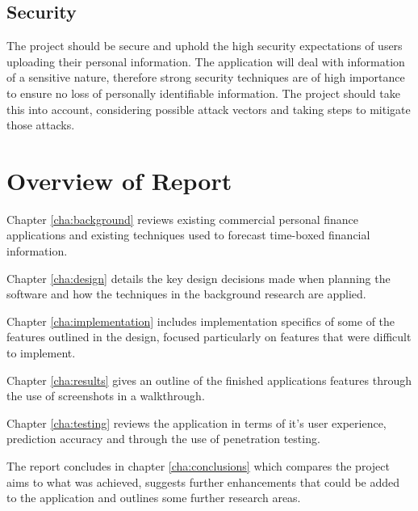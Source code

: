 \subsection{Security}
The project should be secure and uphold the high security expectations of users uploading their personal information.
%
The application will deal with information of a sensitive nature, therefore strong security techniques are of high importance to ensure no loss of personally identifiable information. 
% 
The project should take this into account, considering possible attack vectors and taking steps to mitigate those attacks.

\section{Overview of Report}

Chapter \ref{cha:background} reviews existing commercial personal finance applications and existing techniques used to forecast time-boxed financial information.

Chapter \ref{cha:design} details the key design decisions made when planning the software and how the techniques in the background research are applied.

Chapter \ref{cha:implementation} includes implementation specifics of some of the features outlined in the design, focused particularly on features that were difficult to implement.

Chapter \ref{cha:results} gives an outline of the finished applications features through the use of screenshots in a walkthrough.

Chapter \ref{cha:testing} reviews the application in terms of it's user experience, prediction accuracy and through the use of penetration testing.

The report concludes in chapter \ref{cha:conclusions} which compares the project aims to what was achieved, suggests further enhancements that could be added to the application and outlines some further research areas.